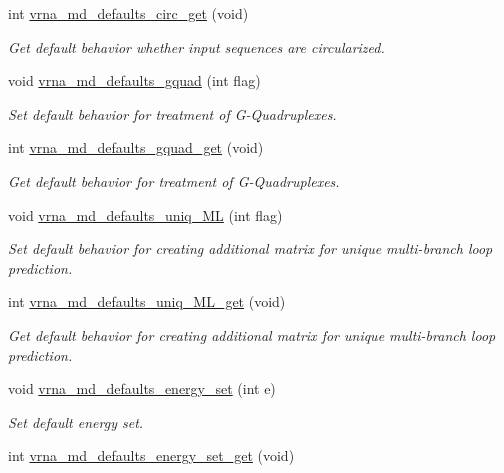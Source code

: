 \begin{DoxyCompactItemize}
int \mbox{\hyperlink{group__model__details_gad3a7e58de344ad93a08925f58f94f6fb}{vrna\+\_\+md\+\_\+defaults\+\_\+circ\+\_\+get}} (void)
\begin{DoxyCompactList}\small\item\em Get default behavior whether input sequences are circularized. \end{DoxyCompactList}\item 
void \mbox{\hyperlink{group__model__details_ga0685ca2aeb39af76f2421fc308163dce}{vrna\+\_\+md\+\_\+defaults\+\_\+gquad}} (int flag)
\begin{DoxyCompactList}\small\item\em Set default behavior for treatment of G-\/\+Quadruplexes. \end{DoxyCompactList}\item 
int \mbox{\hyperlink{group__model__details_gae645b8612f879eb38b45244fa9eddb9e}{vrna\+\_\+md\+\_\+defaults\+\_\+gquad\+\_\+get}} (void)
\begin{DoxyCompactList}\small\item\em Get default behavior for treatment of G-\/\+Quadruplexes. \end{DoxyCompactList}\item 
void \mbox{\hyperlink{group__model__details_ga59b944f61c5d2babec2d4c48c820de67}{vrna\+\_\+md\+\_\+defaults\+\_\+uniq\+\_\+\+ML}} (int flag)
\begin{DoxyCompactList}\small\item\em Set default behavior for creating additional matrix for unique multi-\/branch loop prediction. \end{DoxyCompactList}\item 
int \mbox{\hyperlink{group__model__details_gab48e70fd024bf838404bcbcca0c874a0}{vrna\+\_\+md\+\_\+defaults\+\_\+uniq\+\_\+\+M\+L\+\_\+get}} (void)
\begin{DoxyCompactList}\small\item\em Get default behavior for creating additional matrix for unique multi-\/branch loop prediction. \end{DoxyCompactList}\item 
void \mbox{\hyperlink{group__model__details_ga8dd29c55787a4576277e1907e92d810c}{vrna\+\_\+md\+\_\+defaults\+\_\+energy\+\_\+set}} (int e)
\begin{DoxyCompactList}\small\item\em Set default energy set. \end{DoxyCompactList}\item 
int \mbox{\hyperlink{group__model__details_ga017ed6afb1cba2b7f242412cab618b53}{vrna\+\_\+md\+\_\+defaults\+\_\+energy\+\_\+set\+\_\+get}} (void)

\end{DoxyCompactItemize}
